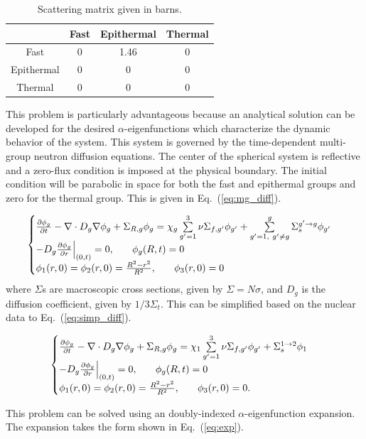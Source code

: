 \documentclass[12pt]{article}
\newcommand{\dxdy}[2]{\frac{\partial #1}{\partial #2}}
\newcommand{\be}{\begin{equation}}
\newcommand{\ee}{\end{equation}}
\newcommand{\pev}{\hspace{0.25in}}
\newcommand{\LEQ}[1]{\label{eq:#1}}
\newcommand{\EQ}[1]{Eq.~(\ref{eq:#1})}
\newcommand{\LTA}[1]{\label{ta:#1}}
\newcommand{\bt}{\begin{table}}
\newcommand{\et}{\end{table}}
\newcommand{\btb}{\begin{center}\begin{tabular}}
\newcommand{\etb}{\end{tabular}\end{center}}
\begin{document}
\bt[h] \centering 
	\caption{Scattering matrix given in barns.} 
	\btb{|c|c|c|c|}
		\hline
		\diagbox{From}{To}& Fast  & Epithermal  & Thermal  \\  \hline
		Fast  & 0 & 1.46 & 0 \\  \hline
		Epithermal & 0 & 0 & 0 \\  \hline
		Thermal  & 0 & 0 & 0 \\  \hline
	\etb \LTA{scat}
\et

This problem is particularly advantageous because an analytical solution can be developed for the desired $\alpha$-eigenfunctions which characterize the dynamic behavior of the system. 
This system is governed by the time-dependent multi-group neutron diffusion equations. The center of the spherical system is reflective and a zero-flux condition is imposed at the physical boundary. The initial condition will be parabolic in space for both the fast and epithermal groups and zero for the thermal group. This is given in \EQ{mg_diff}.

\be
	\begin{cases}
	\dxdy{\phi_g}{t} - \nabla \cdot D_g \nabla \phi_g + \Sigma_{R,g} \phi_g = \chi_g \sum\limits_{g'=1}^{3} \nu\Sigma_{f,g'} \phi_{g'} + \sum\limits_{g'=1, \ g' \neq g}^g \Sigma_s^{g' \rightarrow g} \phi_{g'} \\
	-D_g \dxdy{\phi_g}{r} \Big\rvert_{(0,t)} = 0, \pev \phi_g(R,t) = 0 \\
	\phi_1(r,0) = \phi_2(r,0) = \frac{R^2 - r^2}{R^2}, \pev \phi_3(r,0) = 0
	\end{cases} 
\LEQ{mg_diff} \ee 
where $\Sigma$s are macroscopic cross sections, given by $\Sigma = N\sigma$, and $D_g$ is the diffusion coefficient, given by $1/3\Sigma_t$. This can be simplified based on the nuclear data to \EQ{simp_diff}.

\be
	\begin{cases}
	\dxdy{\phi_g}{t} - \nabla \cdot D_g \nabla \phi_g + \Sigma_{R,g} \phi_g = \chi_1 \sum\limits_{g'=1}^{3} \nu\Sigma_{f,g'} \phi_{g'} + \Sigma_s^{1 \rightarrow 2} \phi_{1} \\
	-D_g \dxdy{\phi_g}{r} \Big\rvert_{(0,t)} = 0, \pev \phi_g(R,t) = 0 \\
	\phi_1(r,0) = \phi_2(r,0) = \frac{R^2 - r^2}{R^2}, \pev \phi_3(r,0) = 0.
	\end{cases} 
\LEQ{simp_diff}\ee

This problem can be solved using an doubly-indexed $\alpha$-eigenfunction expansion.  The expansion takes the form shown in \EQ{exp}.
\end{document}
